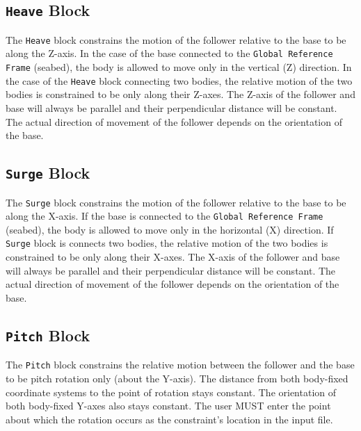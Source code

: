         \subsection{\texttt{Heave} Block}
        The \texttt{Heave} block constrains the motion of the follower
        relative to the base to be along the Z-axis. 
        In the case of the base connected to the \texttt{Global Reference 
		Frame} (seabed), the body is allowed to
        move only in the vertical (Z) direction. In the case of the \texttt{Heave} 
        block connecting two bodies, the relative motion of the two 
        bodies is constrained
        to be only along their Z-axes. 
        The Z-axis of the follower
        and base will always be parallel and their perpendicular distance will
        be constant. The actual direction of movement of the follower depends on
		the orientation of the base.

		\subsection{\texttt{Surge} Block}
        The \texttt{Surge} block constrains the motion of the follower
        relative to the base to be along the X-axis. If the base is connected to 
        the \texttt{Global Reference Frame} (seabed), the body is allowed to
        move only in the horizontal (X) direction. If \texttt{Surge} 
        block is connects two bodies, the relative motion of the two 
        bodies is constrained to be only along their X-axes. The X-axis of the follower
        and base will always be parallel and their perpendicular distance will
        be constant. The actual direction of movement of the follower depends on 
        the orientation of the base.


        \subsection{\texttt{Pitch} Block}
        The \texttt{Pitch} block constrains the relative motion between the 
        follower and the base to be pitch rotation only (about the Y-axis). The 
        distance from both body-fixed coordinate systems to the point of rotation
        stays constant. The orientation of both body-fixed Y-axes also stays
        constant. The user MUST enter the point about which the rotation occurs 
        as the constraint's location in the input file. 

